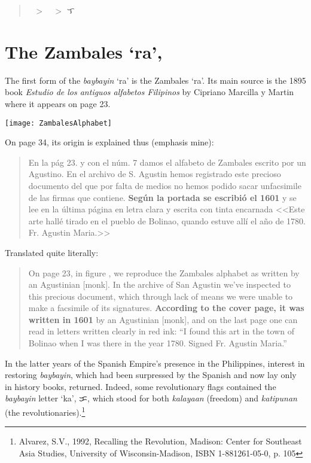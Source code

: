\documentclass[a4paper,pagesize,openany,14pt,parskip=never]{scrbook}
\newcommand{\≈}{$\approx$}
\begin{document}
\begin{quote}
    {\baybayin ᜍ} $>$ {\baybayinh ᜍ} $>$ {\baybayin ᜎ}
\end{quote}


\section{The Zambales `ra', {\baybayinh ᜍ}}

The first form of the {\em baybayin} `ra' is the Zambales `ra'. Its main source is the 1895 book {\em Estudio de los antiguos alfabetos Filipinos} by Cipriano Marcilla y Martin where it appears on page 23. 

\texttt{[image: ZambalesAlphabet]}

On page 34, its origin is explained thus (emphasis mine):

\begin{quote}
    En la p\'ag 23. y con el n\'um. 7 damos el alfabeto de Zambales escrito por un Agustino. En el archivo de S. Agustin hemos registrado este precioso documento del que por falta de medios no hemos podido sacar unfacsimile de las firmas que contiene. {\bfseries Seg\'un la portada se escribi\'o el 1601} y se lee en la \'ultima p\'agina en letra clara y escrita con tinta encarnada <<Este arte hall\'e tirado en el pueblo de Bolinao, quando estuve all\'i el a\~no de 1780. Fr. Agustin Maria.>>
\end{quote}

Translated quite literally:

\begin{quote}
    On page 23, in figure , we reproduce the Zambales alphabet as written by an Agustinian [monk]. In the archive of San Agustin we've inspected to this precious document, which through lack of means we were unable to make a facsimile of its signatures. {\bfseries According to the cover page, it was written in 1601} by an Agustinian [monk], and on the last page one can read in letters written clearly in red ink: ``I found this art in the town of Bolinao when I was there in the year 1780. Signed Fr. Agustin Maria.''
\end{quote}

In the latter years of the Spanish Empire's presence in the Philippines, interest in restoring {\em baybayin}, which had been surpressed by the Spanish and now lay only in history books, returned. Indeed, some revolutionary flags contained the {\em baybayin} letter `ka', {\baybayin ᜃ}, which stood for both {\em kalayaan} (freedom) and {\em katipunan} (the revolutionaries).\footnote{Alvarez, S.V., 1992, Recalling the Revolution, Madison: Center for Southeast Asia Studies, University of Wisconsin-Madison, ISBN 1-881261-05-0, p. 105} 
\end{document}
